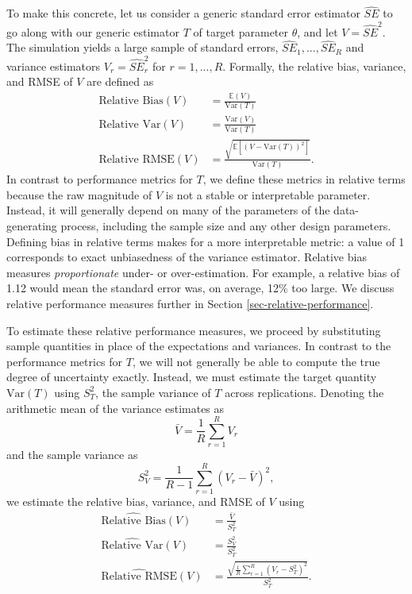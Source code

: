 \documentclass[
]{book}
\newcommand{\E}{\mathbb{E}}
\newcommand{\Var}{\text{Var}}
\begin{document}
To make this concrete, let us consider a generic standard error estimator \(\widehat{SE}\) to go along with our generic estimator \(T\) of target parameter \(\theta\), and let \(V = \widehat{SE}^2\).
The simulation yields a large sample of standard errors, \(\widehat{SE}_1,...,\widehat{SE}_R\) and variance estimators \(V_r = \widehat{SE}_r^2\) for \(r = 1,...,R\).
Formally, the relative bias, variance, and RMSE of \(V\) are defined as
\[
\begin{aligned}
\text{Relative Bias}(V) &= \frac{\E(V)}{\Var(T)} \\
\text{Relative Var}(V) &= \frac{\Var(V)}{\Var(T)} \\
\text{Relative RMSE}(V) &= \frac{\sqrt{\E\left[\left(V - \Var(T)\right)^2 \right]}}{\Var(T)}.
\end{aligned}
\label{eq:relative-bias-variance-RMSE}
\]
In contrast to performance metrics for \(T\), we define these metrics in relative terms because the raw magnitude of \(V\) is not a stable or interpretable parameter.
Instead, it will generally depend on many of the parameters of the data-generating process, including the sample size and any other design parameters.
Defining bias in relative terms makes for a more interpretable metric: a value of 1 corresponds to exact unbiasedness of the variance estimator.
Relative bias measures \emph{proportionate} under- or over-estimation.
For example, a relative bias of 1.12 would mean the standard error was, on average, 12\% too large.
We discuss relative performance measures further in Section \ref{sec-relative-performance}.

To estimate these relative performance measures, we proceed by substituting sample quantities in place of the expectations and variances.
In contrast to the performance metrics for \(T\), we will not generally be able to compute the true degree of uncertainty exactly.
Instead, we must estimate the target quantity \(\Var(T)\) using \(S_T^2\), the sample variance of \(T\) across replications.
Denoting the arithmetic mean of the variance estimates as
\[
\bar{V} = \frac{1}{R} \sum_{r=1}^R V_r
\]
and the sample variance as
\[
S_V^2 = \frac{1}{R - 1}\sum_{r=1}^R \left(V_r - \bar{V}\right)^2,
\]
we estimate the relative bias, variance, and RMSE of \(V\) using
\[
\begin{aligned}
\widehat{\text{Relative Bias}}(V) &= \frac{\bar{V}}{S_T^2} \\
\widehat{\text{Relative Var}}(V) &= \frac{S_V^2}{S_T^2} \\
\widehat{\text{Relative RMSE}}(V) &= \frac{\sqrt{\frac{1}{R}\sum_{r=1}^R\left(V_r - S_T^2\right)^2}}{S_T^2}.
\end{aligned}
\label{eq:relative-bias-variance-RMSE-estimators}
\]
\end{document}
